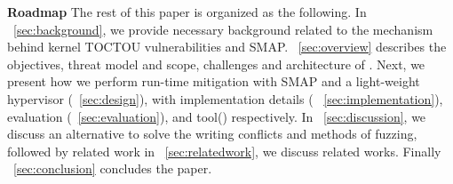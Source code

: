 \textbf{Roadmap}
The rest of this paper is organized as the following. 
In ~\autoref{sec:background}, we provide necessary background related to the mechanism behind kernel TOCTOU vulnerabilities and SMAP. ~\autoref{sec:overview} describes the objectives, threat model and scope, challenges and architecture of \name. Next, we present how we perform run-time mitigation with SMAP and a light-weight hypervisor (~\autoref{sec:design}),  with implementation details ( ~\autoref{sec:implementation}), evaluation (~\autoref{sec:evaluation}), and tool() respectively.  In ~\autoref{sec:discussion},  we discuss an alternative to solve the writing conflicts and methods of fuzzing, followed by related work in ~\autoref{sec:relatedwork}, we discuss related works. Finally ~\autoref{sec:conclusion} concludes the paper.
